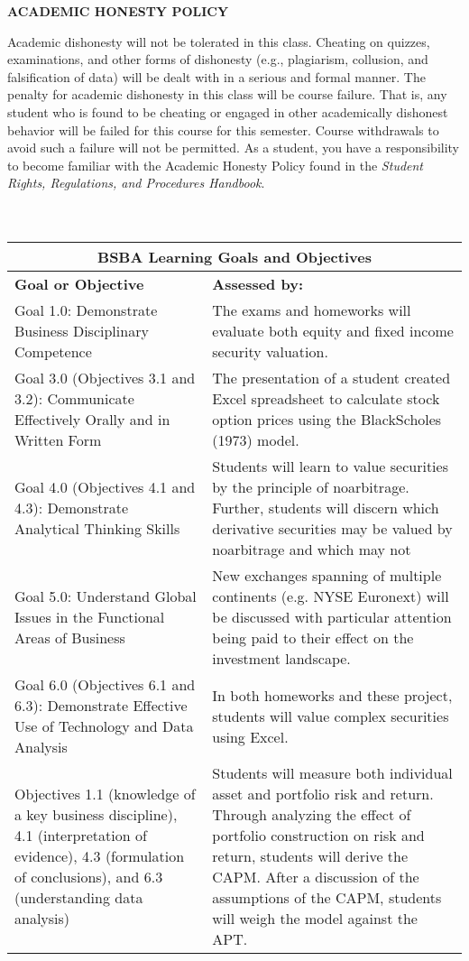 \documentclass{article}
\begin{document}
\begin{center}
{\bf ACADEMIC HONESTY POLICY}
\end{center} 
Academic dishonesty will not be tolerated in this class. Cheating
on quizzes, examinations, and other forms of dishonesty (e.g., plagiarism, collusion, and
falsification of data) will be dealt with in a serious and formal manner. The penalty for academic
dishonesty in this class will be course failure. That is, any student who is found to be cheating
or engaged in other academically dishonest behavior will be failed for this course for this
semester. Course withdrawals to avoid such a failure will not be permitted. As a student, you
have a responsibility to become familiar with the Academic Honesty Policy found in the {\it Student
Rights, Regulations, and Procedures Handbook}.\\
\\
\\
\begin{tabular}{|p{2.1 in}|p{3.1 in}|} \hline
\multicolumn{2}{|c|}{\bf BSBA Learning Goals and Objectives} \\ \hline
{\bf Goal or Objective} & {\bf Assessed by:} \\ \hline
Goal 1.0: Demonstrate Business Disciplinary Competence & The exams and homeworks will evaluate both equity and fixed income security valuation.\\ \hline
%
Goal 3.0 (Objectives 3.1 and 3.2): Communicate Effectively Orally and in Written Form &  The presentation of a student created Excel spreadsheet to  calculate stock option prices using the Black­Scholes (1973) model. \\ \hline
%
Goal 4.0 (Objectives 4.1 and 4.3): Demonstrate Analytical Thinking Skills & Students will learn to value securities by the principle of no­arbitrage. Further, students will discern which derivative securities may be valued by no­arbitrage and which may not \\ \hline
%
Goal 5.0: Understand Global Issues in the Functional Areas of Business &  New exchanges spanning of multiple continents (e.g. NYSE Euronext) will be discussed with particular attention being paid to their effect on the investment landscape. \\ \hline
%
Goal 6.0 (Objectives 6.1 and 6.3): Demonstrate Effective Use of Technology and Data Analysis &  In both homeworks and these project, students will value complex securities using Excel. \\ \hline
%
Objectives 1.1 (knowledge of a key business discipline), 4.1 (interpretation of evidence), 4.3 (formulation of conclusions), and 6.3 (understanding data analysis) &  Students will measure both individual asset and portfolio risk and return. Through analyzing the effect of portfolio construction on risk and return, students will derive the CAPM. After a discussion of the assumptions of the CAPM, students will weigh the model against the APT. \\ \hline
\end{tabular}
\end{document}
